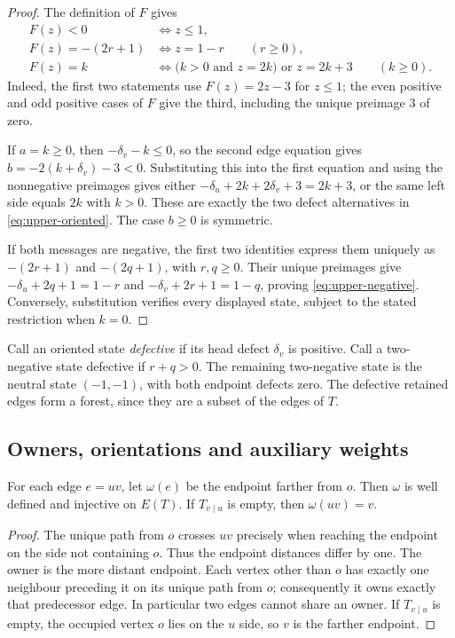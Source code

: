 \begin{proof}
The definition of $F$ gives
\begin{align*}
 F(z)<0&\iff z\leq1,\\
 F(z)=-(2r+1)&\iff z=1-r\qquad(r\geq0),\\
 F(z)=k&\iff
   \bigl(k>0\text{ and }z=2k\bigr)\text{ or }z=2k+3
   \qquad(k\geq0).
\end{align*}
Indeed, the first two statements use $F(z)=2z-3$ for $z\leq1$;
the even positive and odd positive cases of $F$ give the third, including
the unique preimage $3$ of zero.

If $a=k\geq0$, then $-\delta_v-k\leq0$, so the second edge equation
gives $b=-2(k+\delta_v)-3<0$.  Substituting this into the first equation
and using the nonnegative preimages gives either
$-\delta_u+2k+2\delta_v+3=2k+3$, or the same left side equals $2k$
with $k>0$.  These are exactly the two defect alternatives in
\eqref{eq:upper-oriented}.  The case $b\geq0$ is symmetric.

If both messages are negative, the first two identities express them
uniquely as $-(2r+1)$ and $-(2q+1)$, with $r,q\geq0$.
Their unique preimages give
$-\delta_u+2q+1=1-r$ and
$-\delta_v+2r+1=1-q$, proving \eqref{eq:upper-negative}.
Conversely, substitution verifies every displayed state, subject to the
stated restriction when $k=0$.
\end{proof}

Call an oriented state \emph{defective} if its head defect $\delta_v$ is
positive.  Call a two-negative state defective if $r+q>0$.  The remaining
two-negative state is the neutral state $(-1,-1)$, with both endpoint
defects zero.  The defective retained edges form a forest, since they are
a subset of the edges of $T$.

\subsection{Owners, orientations and auxiliary weights}

\begin{lemma}\label{lem:upper-owners}
For each edge $e=uv$, let $\omega(e)$ be the endpoint farther from $o$.
Then $\omega$ is well defined and injective on $E(T)$.  If
$T_{v\mid u}$ is empty, then $\omega(uv)=v$.
\end{lemma}

\begin{proof}
The unique path from $o$ crosses $uv$ precisely when reaching the endpoint
on the side not containing $o$.  Thus the endpoint distances differ by
one.  The owner is the more distant endpoint.  Each vertex other than $o$
has exactly one neighbour preceding it on its unique path from $o$;
consequently it owns exactly that predecessor edge.  In particular two
edges cannot share an owner.  If $T_{v\mid u}$ is empty, the occupied
vertex $o$ lies on the $u$ side, so $v$ is the farther endpoint.
\end{proof}

